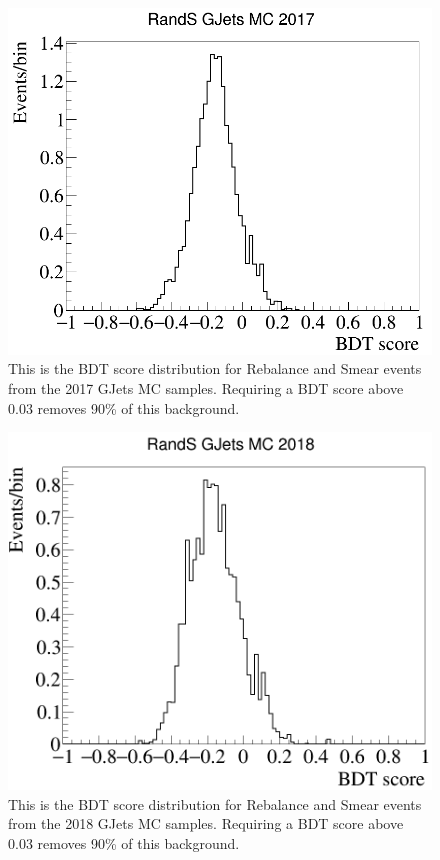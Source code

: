 \begin{figure}[h]
	\centering
	\includegraphics[width=0.7\linewidth]{Figures/GJets_BDT_2017}
	\caption[BDT response to Rebalance and Smear events in 2017 GJets MC]{This is the BDT score distribution for Rebalance and Smear events from the 2017 GJets MC samples. Requiring a BDT score above 0.03 removes 90\% of this background.}
	\label{fig:bdtgjets2017}
\end{figure}
\begin{figure}[h]
	\centering
	\includegraphics[width=0.7\linewidth]{Figures/GJets_BDT_2018}
	\caption[BDT response to Rebalance and Smear events in 2018 GJets MC]{This is the BDT score distribution for Rebalance and Smear events from the 2018 GJets MC samples. Requiring a BDT score above 0.03 removes 90\% of this background.}
	\label{fig:bdtgjets2018}
\end{figure}

